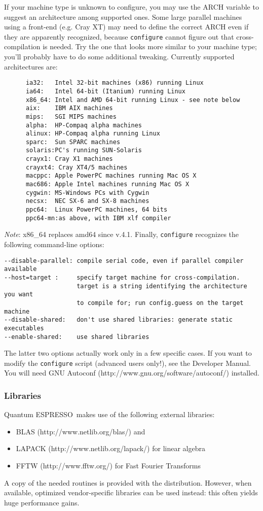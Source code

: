 \documentclass[12pt,a4paper]{article}
\def\qe{{\sc Quantum ESPRESSO}}
\begin{document}
If your machine type is unknown to configure, you may use the ARCH
variable to suggest an architecture among supported ones. Some large
parallel machines using a front-end (e.g. Cray XT) may need to define
the correct ARCH even if they are apparently recognized, because
\texttt{configure} cannot figure out that cross-compilation is needed.
Try the one that
looks more similar to your machine type; you'll probably have to do some
additional tweaking. Currently supported architectures are:
\begin{verbatim}
      ia32:   Intel 32-bit machines (x86) running Linux
      ia64:   Intel 64-bit (Itanium) running Linux
      x86_64: Intel and AMD 64-bit running Linux - see note below
      aix:    IBM AIX machines
      mips:   SGI MIPS machines
      alpha:  HP-Compaq alpha machines
      alinux: HP-Compaq alpha running Linux
      sparc:  Sun SPARC machines
      solaris:PC's running SUN-Solaris
      crayx1: Cray X1 machines
      crayxt4: Cray XT4/5 machines
      macppc: Apple PowerPC machines running Mac OS X
      mac686: Apple Intel machines running Mac OS X
      cygwin: MS-Windows PCs with Cygwin
      necsx:  NEC SX-6 and SX-8 machines
      ppc64:  Linux PowerPC machines, 64 bits
      ppc64-mn:as above, with IBM xlf compiler
\end{verbatim}
{\em Note}: x86\_64 replaces amd64 since v.4.1. 
Finally, \texttt{configure} recognizes the following command-line options:
\begin{verbatim}
--disable-parallel: compile serial code, even if parallel compiler available
--host=target :     specify target machine for cross-compilation.
                    target is a string identifying the architecture you want
                    to compile for; run config.guess on the target machine
--disable-shared:   don't use shared libraries: generate static executables
--enable-shared:    use shared libraries
\end{verbatim}
The latter two options actually work only in a few specific cases.
If you want to modify the \texttt{configure} script (advanced users only!), 
see the Developer Manual.  You will need GNU Autoconf 
(http://www.gnu.org/software/autoconf/) installed.

\subsubsection{Libraries}
\label{Sec:Libraries}

\qe\ makes use of the following external libraries:
\begin{itemize}
\item BLAS (http://www.netlib.org/blas/) and 
\item LAPACK (http://www.netlib.org/lapack/) for linear algebra 
\item FFTW (http://www.fftw.org/) for Fast Fourier Transforms
\end{itemize}
A copy of the needed routines is provided with the distribution. However,
when available, optimized vendor-specific libraries can be used instead: this
often yields huge performance gains.
\end{document}
